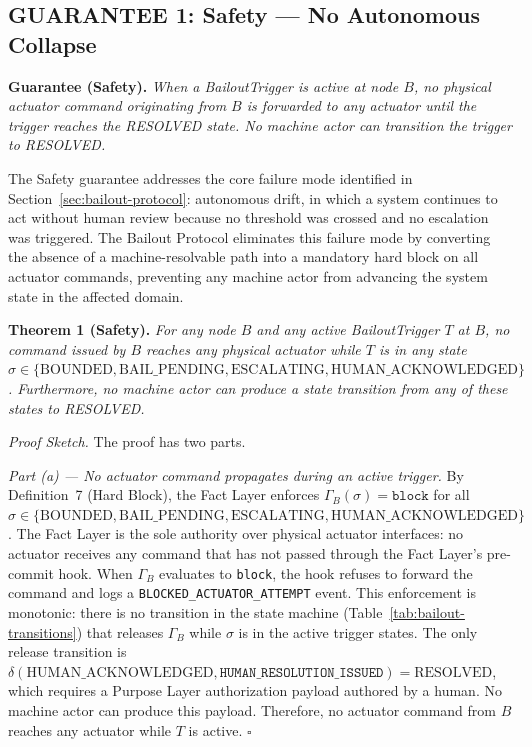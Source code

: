 \subsection{GUARANTEE 1: Safety — No Autonomous Collapse}
\label{sec:guarantee-safety}

\bigskip

\begin{minipage}{\textwidth}
\textbf{Guarantee (Safety).} \textit{When a BailoutTrigger is active at node $B$, no physical actuator command originating from $B$ is forwarded to any actuator until the trigger reaches the RESOLVED state. No machine actor can transition the trigger to RESOLVED.}
\end{minipage}

\bigskip

The Safety guarantee addresses the core failure mode identified in Section~\ref{sec:bailout-protocol}: autonomous drift, in which a system continues to act without human review because no threshold was crossed and no escalation was triggered. The Bailout Protocol eliminates this failure mode by converting the absence of a machine-resolvable path into a mandatory hard block on all actuator commands, preventing any machine actor from advancing the system state in the affected domain.

\bigskip

\noindent\textbf{Theorem 1 (Safety).}
\textit{For any node $B$ and any active BailoutTrigger $T$ at $B$, no command issued by $B$ reaches any physical actuator while $T$ is in any state $\sigma \in \{\text{BOUNDED}, \text{BAIL\_PENDING}, \text{ESCALATING}, \text{HUMAN\_ACKNOWLEDGED}\}$. Furthermore, no machine actor can produce a state transition from any of these states to RESOLVED.}

\bigskip

\noindent\textit{Proof Sketch.} The proof has two parts.

\bigskip

\noindent\textit{Part (a) — No actuator command propagates during an active trigger.} By Definition~7 (Hard Block), the Fact Layer enforces $\Gamma_B(\sigma) = \texttt{block}$ for all $\sigma \in \{\text{BOUNDED}, \text{BAIL\_PENDING}, \text{ESCALATING}, \text{HUMAN\_ACKNOWLEDGED}\}$. The Fact Layer is the sole authority over physical actuator interfaces: no actuator receives any command that has not passed through the Fact Layer's pre-commit hook. When $\Gamma_B$ evaluates to \texttt{block}, the hook refuses to forward the command and logs a \texttt{BLOCKED\_ACTUATOR\_ATTEMPT} event. This enforcement is monotonic: there is no transition in the state machine (Table~\ref{tab:bailout-transitions}) that releases $\Gamma_B$ while $\sigma$ is in the active trigger states. The only release transition is $\delta(\text{HUMAN\_ACKNOWLEDGED}, \texttt{HUMAN\_RESOLUTION\_ISSUED}) = \text{RESOLVED}$, which requires a Purpose Layer authorization payload authored by a human. No machine actor can produce this payload. Therefore, no actuator command from $B$ reaches any actuator while $T$ is active. $\square$

